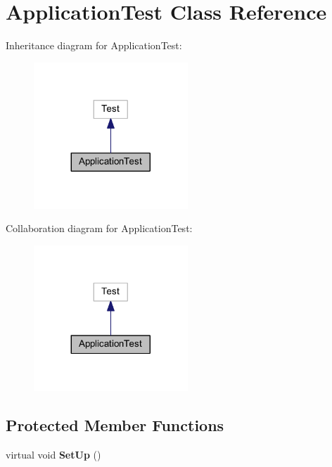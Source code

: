\hypertarget{class_application_test}{}\section{Application\+Test Class Reference}
\label{class_application_test}


Inheritance diagram for Application\+Test\+:\nopagebreak
\begin{figure}[H]
\begin{center}
\leavevmode
\includegraphics[width=164pt]{class_application_test__inherit__graph}
\end{center}
\end{figure}


Collaboration diagram for Application\+Test\+:\nopagebreak
\begin{figure}[H]
\begin{center}
\leavevmode
\includegraphics[width=164pt]{class_application_test__coll__graph}
\end{center}
\end{figure}
\subsection*{Protected Member Functions}
\begin{DoxyCompactItemize}
\item 
\hypertarget{class_application_test_a0ed0ce167bcb37c85c5c0bec236296d2}{}\label{class_application_test_a0ed0ce167bcb37c85c5c0bec236296d2} 
virtual void {\bfseries Set\+Up} ()
\end{DoxyCompactItemize}
